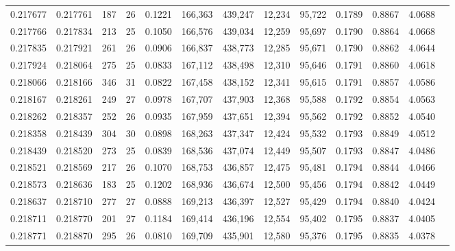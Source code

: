 \begin{tabular}{rrrrrrrrrrrrr}
0.217677 & 0.217761 &   187 &  26 &                                     0.1221 & 166,363 & 439,247 &  12,234 &  95,722 & 0.1789 & 0.8867 & 4.0688 \\
0.217766 & 0.217834 &   213 &  25 &                                     0.1050 & 166,576 & 439,034 &  12,259 &  95,697 & 0.1790 & 0.8864 & 4.0668 \\
0.217835 & 0.217921 &   261 &  26 &                                     0.0906 & 166,837 & 438,773 &  12,285 &  95,671 & 0.1790 & 0.8862 & 4.0644 \\
0.217924 & 0.218064 &   275 &  25 &                                     0.0833 & 167,112 & 438,498 &  12,310 &  95,646 & 0.1791 & 0.8860 & 4.0618 \\
0.218066 & 0.218166 &   346 &  31 &                                     0.0822 & 167,458 & 438,152 &  12,341 &  95,615 & 0.1791 & 0.8857 & 4.0586 \\
0.218167 & 0.218261 &   249 &  27 &                                     0.0978 & 167,707 & 437,903 &  12,368 &  95,588 & 0.1792 & 0.8854 & 4.0563 \\
0.218262 & 0.218357 &   252 &  26 &                                     0.0935 & 167,959 & 437,651 &  12,394 &  95,562 & 0.1792 & 0.8852 & 4.0540 \\
0.218358 & 0.218439 &   304 &  30 &                                     0.0898 & 168,263 & 437,347 &  12,424 &  95,532 & 0.1793 & 0.8849 & 4.0512 \\
0.218439 & 0.218520 &   273 &  25 &                                     0.0839 & 168,536 & 437,074 &  12,449 &  95,507 & 0.1793 & 0.8847 & 4.0486 \\
0.218521 & 0.218569 &   217 &  26 &                                     0.1070 & 168,753 & 436,857 &  12,475 &  95,481 & 0.1794 & 0.8844 & 4.0466 \\
0.218573 & 0.218636 &   183 &  25 &                                     0.1202 & 168,936 & 436,674 &  12,500 &  95,456 & 0.1794 & 0.8842 & 4.0449 \\
0.218637 & 0.218710 &   277 &  27 &                                     0.0888 & 169,213 & 436,397 &  12,527 &  95,429 & 0.1794 & 0.8840 & 4.0424 \\
0.218711 & 0.218770 &   201 &  27 &                                     0.1184 & 169,414 & 436,196 &  12,554 &  95,402 & 0.1795 & 0.8837 & 4.0405 \\
0.218771 & 0.218870 &   295 &  26 &                                     0.0810 & 169,709 & 435,901 &  12,580 &  95,376 & 0.1795 & 0.8835 & 4.0378 \\

\end{tabular}
